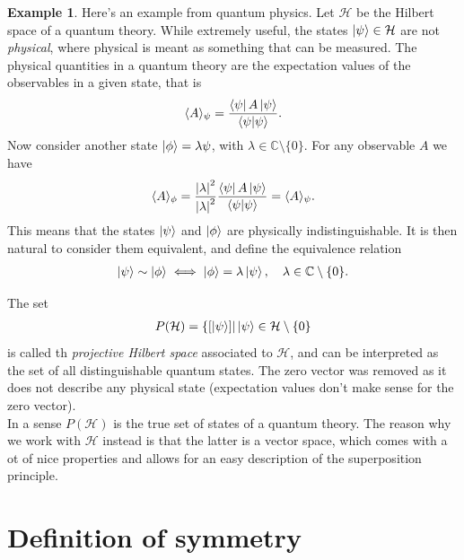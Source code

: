 \documentclass{book}
\theoremstyle{definition}
\newtheorem{exmp}{Example}[section]
\newcommand{\had}{\mathcal{H}}
\newcommand{\f}[2]{\frac{#1}{#2}}
\begin{document}
\begin{exmp}
	Here’s an example from quantum physics. Let $\had$ be the Hilbert space of a quantum theory. While extremely useful, the states $\ket{\psi} \in \had$ are not \textit{physical}, where physical is meant as something that can be measured. The physical quantities in a quantum theory are the expectation values of the observables in a given state, that is 
	\begin{align}
	\langle A \rangle_\psi = \f{\bra{\psi}A\ket{\psi}}{\braket{\psi}}.
	\end{align}
	Now consider another state $\ket{\phi} = \lambda{\psi}$, with $\lambda \in \mathbb{C}\setminus \{0\}$. For any observable $A$ we have
	\begin{align}
	\langle A \rangle_\phi = \f{\abs{\lambda}^2}{\abs{\lambda}^2}\f{\bra{\psi}A\ket{\psi}}{\braket{\psi}} = \langle A \rangle_\psi.
	\end{align}
	This means that the states $\ket{\psi}$ and $\ket{\phi}$ are physically indistinguishable. It is then natural to consider them equivalent, and define the equivalence relation 
	\begin{align}
	\ket{\psi} \sim \ket{\phi} \iff \ket{\phi} = \lambda\ket{\psi}, \quad \lambda \in \mathbb{C}\setminus \{0\}.
	\end{align}
	
	The set 
	\begin{align}
	P(\had) = \{ [\ket{\psi}] \vert \ket{\psi} \in \had\setminus\{0   \}
	\end{align}
	is called th \textit{projective Hilbert space} associated to $\had$, and can be interpreted as the set of all distinguishable quantum states. The zero vector was removed as it does not describe any physical state (expectation values don't make sense for the zero vector). \\
	
	In a sense $P(\had)$ is the true set of states of a quantum theory. The reason why we work with $\had$ instead is that the latter is a vector space, which comes with a ot of nice properties and allows for an easy description of the superposition principle. 
	
	
	
\end{exmp}




\newpage



\section{Definition of symmetry}
\end{document}
